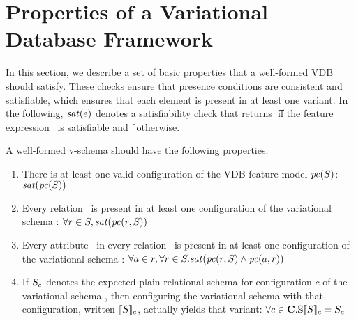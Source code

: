 \section{Properties of a Variational Database Framework}
\label{sec:vdbfprop}





In this section, we describe a set of basic properties that a well-formed VDB
should satisfy.
%
These checks ensure that presence conditions are consistent and satisfiable,
which ensures that each element is present in at least one variant.
%
In the following, $\sat\dimMeta$ denotes a satisfiability check
that returns \t\ if the feature expression \dimMeta\ is satisfiable and \f\
otherwise.


A well-formed v-schema should have the following properties:
%
\begin{enumerate}
%
\item There is at least one valid configuration of the VDB feature model $\getPC \vSch$:
%
$\sat {\getPC \vSch}$
%
\item Every relation \vRel\ is present in at least one configuration of the
variational schema \vSch:
%
$\forall\vRel\in\vSch, \sat{\getPCfrom \vRel \vSch}$
%
\item Every attribute \vAtt\ in every relation \vRel\ is present in at least one
configuration of the variational schema \vSch:
%
$\forall\vAtt\in\vRel, \forall\vRel\in\vSch.
\sat{\getPCfrom \vRel \vSch \wedge\getPCfrom \vAtt \vRel}$
%
\item If $\vSch_\config$ denotes the expected plain relational schema for
configuration $c$ of the variational schema \vSch, then configuring the
variational schema with that configuration, written $\sem[\config]{\vSch}$,
actually yields that variant:
%
$\forall\config\in\confSet. \osSem {\vSch} = \vSch_\config$
%
\end{enumerate}


